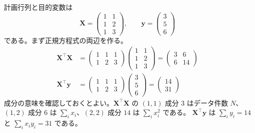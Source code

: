 計画行列と目的変数は
\begin{equation*}
  \bm{X} = \begin{pmatrix} 1 & 1 \\ 1 & 2 \\ 1 & 3 \end{pmatrix}, \qquad
  \bm{y} = \begin{pmatrix} 3 \\ 5 \\ 6 \end{pmatrix}
\end{equation*}
である。まず正規方程式の両辺を作る。
\begin{align*}
  \bm{X}^\top\bm{X}
    &= \begin{pmatrix} 1 & 1 & 1 \\ 1 & 2 & 3 \end{pmatrix}
       \begin{pmatrix} 1 & 1 \\ 1 & 2 \\ 1 & 3 \end{pmatrix}
     = \begin{pmatrix} 3 & 6 \\ 6 & 14 \end{pmatrix} \\
  \bm{X}^\top\bm{y}
    &= \begin{pmatrix} 1 & 1 & 1 \\ 1 & 2 & 3 \end{pmatrix}
       \begin{pmatrix} 3 \\ 5 \\ 6 \end{pmatrix}
     = \begin{pmatrix} 14 \\ 31 \end{pmatrix}
\end{align*}
成分の意味を確認しておくとよい。$\bm{X}^\top\bm{X}$ の $(1,1)$ 成分 $3$ はデータ件数 $N$、
$(1,2)$ 成分 $6$ は $\sum_i x_i$、$(2,2)$ 成分 $14$ は $\sum_i x_i^2$ である。
$\bm{X}^\top\bm{y}$ は $\sum_i y_i = 14$ と $\sum_i x_i y_i = 31$ である。

